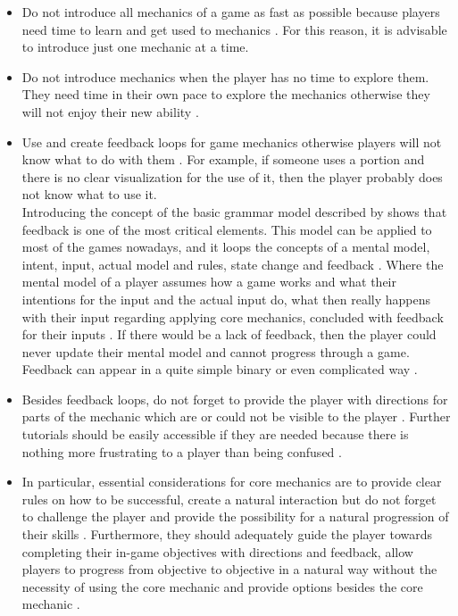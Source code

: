 \documentclass[MGS,Master,english]{twbook}%
\begin{document}
\begin{itemize}
	\item Do not introduce all mechanics of a game as fast as possible because players need time to learn and get used to mechanics \cite{mechanic::gamasutra::MaxPears}. For this reason, it is advisable to introduce just one mechanic at a time. 
	\item Do not introduce mechanics when the player has no time to explore them. They need time in their own pace to explore the mechanics otherwise they will not enjoy their new ability \cite{mechanic::gamasutra::MaxPears}. 
	\item Use and create feedback loops for game mechanics otherwise players will not know what to do with them \cite{gameDesign::gameMechanicsAdvancedGameDesign}. For example, if someone uses a portion and there is no clear visualization for the use of it, then the player probably does not know what to use it. \\
	Introducing the concept of the basic grammar model described by \citep{mechanic::BasicGrammarModel} shows that feedback is one of the most critical elements. This model can be applied to most of the games nowadays, and it loops the concepts of a mental model, intent, input, actual model and rules, state change and feedback \cite{mechanic::BasicGrammarModel}. Where the mental model of a player assumes how a game works and what their intentions for the input and the actual input do, what then really happens with their input regarding applying core mechanics, concluded with feedback for their inputs \cite{mechanic::BasicGrammarModel}. If there would be a lack of feedback, then the player could never update their mental model and cannot progress through a game. Feedback can appear in a quite simple binary or even complicated way \cite{mechanic::BasicGrammarModel}.
	\item Besides feedback loops, do not forget to provide the player with directions for parts of the mechanic which are or could not be visible to the player \cite{mechanic::gamasutra::MaxPears}. Further tutorials should be easily accessible if they are needed because there is nothing more frustrating to a player than being confused \cite{mechanic::gamasutra::DanielDoan}.
	\item In particular, essential considerations for core mechanics are to provide clear rules on how to be successful, create a natural interaction but do not forget to challenge the player and provide the possibility for a natural progression of their skills \cite{mechanic::gamasutra::DanielDoan}. Furthermore, they should adequately guide the player towards completing their in-game objectives with directions and feedback, allow players to progress from objective to objective in a natural way without the necessity of using the core mechanic and provide options besides the core mechanic \cite{mechanic::gamasutra::DanielDoan}. 

\end{itemize}
\end{document}
